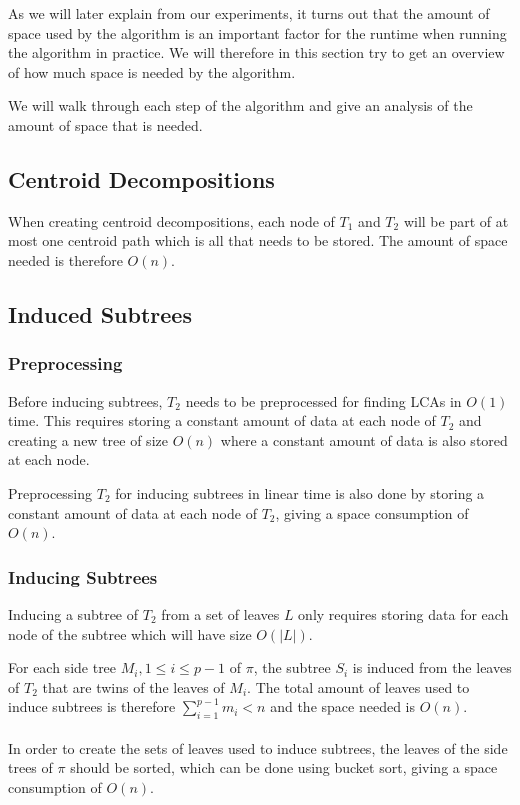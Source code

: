 As we will later explain from our experiments, it turns out that the amount of space used by the algorithm is an important factor for the runtime when running the algorithm in practice. We will therefore in this section try to get an overview of how much space is needed by the algorithm.

We will walk through each step of the algorithm and give an analysis of the amount of space that is needed.

\subsection{Centroid Decompositions}
When creating centroid decompositions, each node of $T_1$ and $T_2$ will be part of at most one centroid path which is all that needs to be stored. The amount of space needed is therefore $O(n)$.

\subsection{Induced Subtrees}
\subsubsection{Preprocessing}
Before inducing subtrees, $T_2$ needs to be preprocessed for finding LCAs in $O(1)$ time. This requires storing a constant amount of data at each node of $T_2$ and creating a new tree of size $O(n)$ where a constant amount of data is also stored at each node.

Preprocessing $T_2$ for inducing subtrees in linear time is also done by storing a constant amount of data at each node of $T_2$, giving a space consumption of $O(n)$.

\subsubsection{Inducing Subtrees}
Inducing a subtree of $T_2$ from a set of leaves $L$ only requires storing data for each node of the subtree which will have size $O(|L|)$.

For each side tree $M_i, 1 \le i \le p-1$ of $\pi$, the subtree $S_i$ is induced from the leaves of $T_2$ that are twins of the leaves of $M_i$. The total amount of leaves used to induce subtrees is therefore $\sum_{i=1}^{p-1} m_i < n$ and the space needed is $O(n)$.
\\
\\
In order to create the sets of leaves used to induce subtrees, the leaves of the side trees of $\pi$ should be sorted, which can be done using bucket sort, giving a space consumption of $O(n)$.

